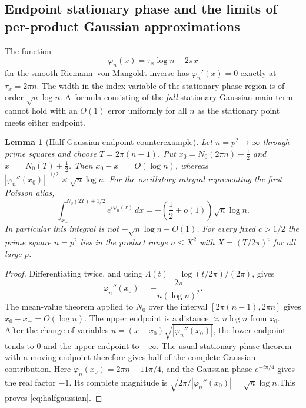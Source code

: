 \documentclass[11pt,reqno]{amsart}
\numberwithin{equation}{section}
\newtheorem{lemma}[theorem]{Lemma}
\newcommand{\lamb}{\Lambda}
\begin{document}
\subsection{Endpoint stationary phase and the limits of per-product Gaussian approximations}
The function
\[
\varphi_n(x)=\tau_x\log n-2\pi x
\]
for the smooth Riemann--von Mangoldt inverse has
$\varphi_n'(x)=0$ exactly at $\tau_x=2\pi n$.
The width in the index variable of the stationary-phase region is
of order $\sqrt n\log n$. A formula consisting of the \emph{full}
stationary Gaussian main term cannot hold with an $O(1)$ error
uniformly for all $n$ as the stationary point meets either endpoint.

\begin{lemma}[Half-Gaussian endpoint counterexample]
\label{lem:endpointfresnel}
Let $n=p^2\to\infty$ through prime squares and choose
$T=2\pi(n-1)$. Put $x_0=N_0(2\pi n)+\frac12$ and
$x_-=N_0(T)+\frac12$. Then $x_0-x_-=O(\log n)$, whereas
$|\varphi_n''(x_0)|^{-1/2}\asymp\sqrt n\log n$.
For the oscillatory integral representing the first Poisson alias,
\begin{equation}\label{eq:halfgaussian}
\int_{x_-}^{N_0(2T)+1/2}e^{i\varphi_n(x)}\,dx
= -\left(\frac12+o(1)\right)\sqrt n\log n.
\end{equation}
In particular this integral is \emph{not}
$-\sqrt n\log n+O(1)$. For every fixed $c>1/2$ the
prime square $n=p^2$ lies in the product range
$n\le X^2$ with $X=(T/2\pi)^c$ for all large $p$.
\end{lemma}
\begin{proof}
Differentiating twice, and using
$\lamb(t)=\log(t/2\pi)/(2\pi)$, gives
\[
\varphi_n''(x_0)=-\frac{2\pi}{n(\log n)^2}.
\]
The mean-value theorem applied to $N_0$ over the interval
$[2\pi(n-1),2\pi n]$ gives $x_0-x_-=O(\log n)$.
The upper endpoint is a distance $\asymp n\log n$ from $x_0$.
After the change of variables
$u=(x-x_0)\sqrt{|\varphi_n''(x_0)|}$,
the lower endpoint tends to $0$ and the upper endpoint to
$+\infty$. The usual stationary-phase theorem with a moving
endpoint therefore gives half of the complete Gaussian
contribution. Here
$\varphi_n(x_0)=2\pi n-11\pi/4$, and the Gaussian phase
$e^{-i\pi/4}$ gives the real factor $-1$. Its complete magnitude is
$\sqrt{2\pi/|\varphi_n''(x_0)|}=\sqrt n\log n$.This proves \eqref{eq:halfgaussian}.
\end{proof}
\end{document}
